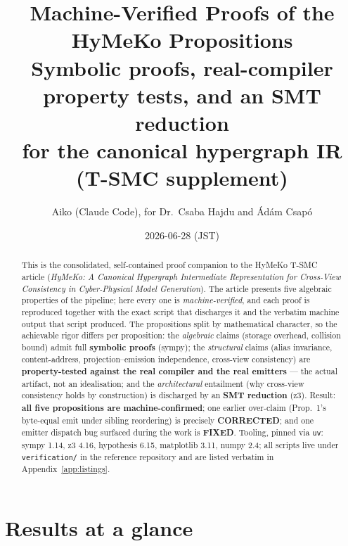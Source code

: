 \documentclass[11pt]{article}
\title{\textbf{Machine-Verified Proofs of the HyMeKo Propositions}\\[4pt]
\large Symbolic proofs, real-compiler property tests, and an SMT reduction\\
for the canonical hypergraph IR (T-SMC supplement)}
\author{Aiko (Claude Code), for Dr.\ Csaba Hajdu and \'Ad\'am Csap\'o}
\date{2026-06-28 (JST)}
\theoremstyle{definition}
\newcommand{\corrected}{\textcolor{orange!85!black}{\textbf{CORRECTED}}}
\newcommand{\fixed}{\textcolor{blue!60!black}{\textbf{FIXED}}}
\begin{document}
\maketitle

\begin{abstract}
\noindent This is the consolidated, self-contained proof companion to the HyMeKo T-SMC article
(\emph{HyMeKo: A Canonical Hypergraph Intermediate Representation for Cross-View Consistency in Cyber-Physical
Model Generation}). The article presents five algebraic properties of the pipeline; here every one is
\emph{machine-verified}, and each proof is reproduced together with the exact script that discharges it and the
verbatim machine output that script produced. The propositions split by mathematical character, so the achievable
rigor differs per proposition: the \emph{algebraic} claims (storage overhead, collision bound) admit full
\textbf{symbolic proofs} (\textsf{sympy}); the \emph{structural} claims (alias invariance, content-address,
projection--emission independence, cross-view consistency) are \textbf{property-tested against the real compiler
and the real emitters} --- the actual artifact, not an idealisation; and the \emph{architectural} entailment
(why cross-view consistency holds by construction) is discharged by an \textbf{SMT reduction} (\textsf{z3}).
Result: \textbf{all five propositions are machine-confirmed}; one earlier over-claim (Prop.~1's byte-equal emit
under sibling reordering) is precisely \corrected; and one emitter dispatch bug surfaced during the work is
\fixed. Tooling, pinned via \texttt{uv}: \textsf{sympy 1.14, z3 4.16, hypothesis 6.15, matplotlib 3.11,
numpy 2.4}; all scripts live under \texttt{verification/} in the reference repository and are listed verbatim in
Appendix~\ref{app:listings}.
\end{abstract}

\tableofcontents

\section{Results at a glance}
\end{document}
